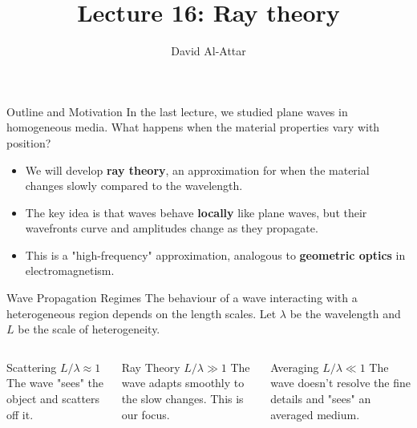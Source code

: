 \documentclass{beamer}
\title[Lecture 16: Ray theory]{Lecture 16: Ray theory}
\author{David Al-Attar}
\institute{Michaelmas term 2024}
\date{}
\begin{document}

\begin{frame}
    \titlepage
\end{frame}

\begin{frame}{Outline and Motivation}
    In the last lecture, we studied plane waves in homogeneous media. What happens when the material properties vary with position?
    \begin{itemize}
        \item We will develop \textbf{ray theory}, an approximation for when the material changes slowly compared to the wavelength.
        \pause
        \item The key idea is that waves behave \textbf{locally} like plane waves, but their wavefronts curve and amplitudes change as they propagate.
        \pause
        \item This is a "high-frequency" approximation, analogous to \textbf{geometric optics} in electromagnetism.
    \end{itemize}
\end{frame}


\begin{frame}{Wave Propagation Regimes}
    The behaviour of a wave interacting with a heterogeneous region depends on the length scales. Let $\lambda$ be the wavelength and $L$ be the scale of heterogeneity.
    \pause
    \begin{columns}
        \begin{alertblock}{Scattering}
            $L/\lambda \approx 1$
            \pause
            \centering
            The wave "sees" the object and scatters off it.
        \end{alertblock}

        \begin{alertblock}{Ray Theory}
            $L/\lambda \gg 1$
            \pause
            \centering
            The wave adapts smoothly to the slow changes. This is our focus.
        \end{alertblock}

        \begin{alertblock}{Averaging}
            $L/\lambda \ll 1$
            \pause
            \centering
            The wave doesn't resolve the fine details and "sees" an averaged medium.
        \end{alertblock}
    \end{columns}
\end{frame}
\end{document}
